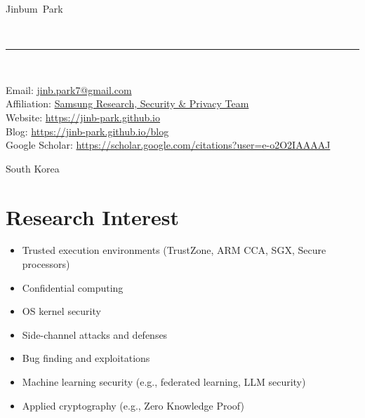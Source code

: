 \documentclass[10pt, a4paper]{article}
\makeatletter
\newcommand{\FirstName}{Jinbum}
\newcommand{\LastName}{Park}
\newcommand{\MyName}{\FirstName\ \LastName}
\newcommand{\Email}{jinb.park7@gmail.com}
\newcommand{\PersonalWebsite}{https://jinb-park.github.io}
\newcommand{\Address}{
  South Korea
}
\newcommand{\Website}[1]{\href{https://#1}{#1}}
\makeatother
\begin{document}
\thispagestyle{empty}

\begin{minipage}[t]{0.7\textwidth}
{\fontsize{22pt}{0}\selectfont\MyName}
\end{minipage}
\\[-0.1cm]
\rule{\textwidth}{2pt}
\\[0.1cm]
\begin{minipage}[t]{0.7\textwidth}
    Email: \href{mailto:\Email}{\Email}
    \\
    Affiliation: \href{https://research.samsung.com/security_privacy}{Samsung Research, Security \& Privacy Team}
    \\
    Website: \Website{\PersonalWebsite}
    \\
    Blog: \Website{https://jinb-park.github.io/blog}
    \\
    Google Scholar: \href{https://scholar.google.com/citations?user=e-o2O2IAAAAJ}{https://scholar.google.com/citations?user=e-o2O2IAAAAJ}
\end{minipage}
\begin{minipage}[t]{0.3\textwidth}
  \begin{flushright}
    \Address
  \end{flushright}
\end{minipage}

\section{Research Interest}

\begin{itemize}
  \item Trusted execution environments (TrustZone, ARM CCA, SGX, Secure processors)
  \item Confidential computing
  \item OS kernel security
  \item Side-channel attacks and defenses
  \item Bug finding and exploitations
  \item Machine learning security (e.g., federated learning, LLM security)
  \item Applied cryptography (e.g., Zero Knowledge Proof)
\end{itemize}
\end{document}
